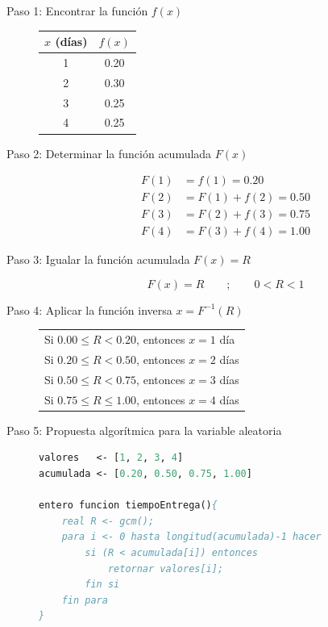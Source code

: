 \begin{description}
    \item[Paso 1: Encontrar la función $f(x)$]

    \begin{center}
    \begin{tabular}{cc}
    \toprule
    $x$ (días) & $f(x)$ \\
    \midrule
    1 & 0.20 \\ 2 & 0.30 \\ 3 & 0.25 \\ 4 & 0.25 \\
    \bottomrule
    \end{tabular}
    \end{center}

    \item[Paso 2: Determinar la función acumulada $F(x)$]

    \begin{align*}
    F(1) &= f(1) = 0.20 \\
    F(2) &= F(1)+f(2) = 0.50 \\
    F(3) &= F(2)+f(3) = 0.75 \\
    F(4) &= F(3)+f(4) = 1.00
    \end{align*}

    \item[Paso 3: Igualar la función acumulada $F(x) = R$]

    $$ F(x)=R \qquad ; \qquad 0 < R < 1 $$

    \item[Paso 4: Aplicar la función inversa $x=F^{-1}(R)$]

    \begin{center}
    \begin{tabular}{l}
    Si $0.00 \leq R < 0.20$, entonces $x=1$ día \\
    Si $0.20 \leq R < 0.50$, entonces $x=2$ días \\
    Si $0.50 \leq R < 0.75$, entonces $x=3$ días \\
    Si $0.75 \leq R \leq 1.00$, entonces $x=4$ días \\
    \end{tabular}
    \end{center}

    \item[Paso 5: Propuesta algorítmica para la variable aleatoria]

    \begin{lstlisting}[caption={tiempoEntrega()}, language=Pascal]
valores   <- [1, 2, 3, 4]
acumulada <- [0.20, 0.50, 0.75, 1.00]

entero funcion tiempoEntrega(){
    real R <- gcm();
    para i <- 0 hasta longitud(acumulada)-1 hacer
        si (R < acumulada[i]) entonces
            retornar valores[i];
        fin si
    fin para
}
    \end{lstlisting}
\end{description}

